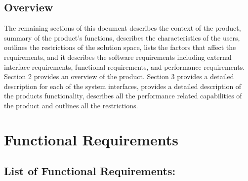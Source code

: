 \documentclass[11pt]{article}
\begin{document}
	\subsection{Overview}
	The remaining sections of this document describes the context of the product, summary of the product’s functions, describes the characteristics of the users, outlines the restrictions of the solution space, lists the factors that affect the requirements, and it describes the software requirements including external interface requirements, functional requirements,  and performance requirements. Section 2 provides an overview of the product. Section 3 provides a detailed description for each of the system interfaces, provides a detailed description of the products functionality, describes all the performance related capabilities of the product and outlines all the restrictions. 

	\section{Functional Requirements}
	
	\subsection{List of Functional Requirements:}
	
\end{document}
